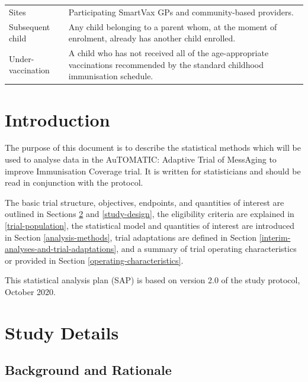 \documentclass[
  bibliography=totoc]{scrreprt}
\begin{document}
\begin{table}[H]
\begin{tabular}{l>{\raggedright\arraybackslash}p{25em}}
Sites & Participating SmartVax GPs and community-based providers.\newline \\
Subsequent child & Any child belonging to a parent whom, at the moment of enrolment, already has another child enrolled.\newline \\
Under-vaccination & A child who has not received all of the age-appropriate vaccinations recommended by the standard childhood immunisation schedule.\newline \\
\bottomrule
\end{tabular}
\endgroup{}
\end{table}

\hypertarget{introduction}{%
\chapter{Introduction}\label{introduction}}

The purpose of this document is to describe the statistical methods which will be used to analyse data in the AuTOMATIC: Adaptive Trial of MessAging to improve Immunisation Coverage trial.
It is written for statisticians and should be read in conjunction with the protocol.

The basic trial structure, objectives, endpoints, and quantities of interest are outlined in Sections \ref{study-details} and \ref{study-design}, the eligibility criteria are explained in \ref{trial-population}, the statistical model and quantities of interest are introduced in Section \ref{analysis-methods}, trial adaptations are defined in Section \ref{interim-analyses-and-trial-adaptations}, and a summary of trial operating characteristics or provided in Section \ref{operating-characteristics}.

This statistical analysis plan (SAP) is based on version 2.0 of the study protocol, October 2020.

\hypertarget{study-details}{%
\chapter{Study Details}\label{study-details}}

\hypertarget{background-and-rationale}{%
\section{Background and Rationale}\label{background-and-rationale}}
\end{document}
